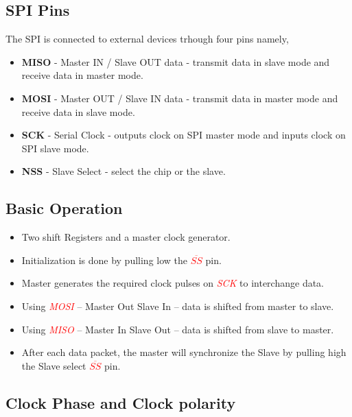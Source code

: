 \documentclass{article}
\newcommand{\pinFormat}[1]{\emph{\textcolor{red}{#1}}}
\begin{document}
\subsection{SPI Pins}
\quad The SPI is connected to external devices trhough four pins namely,
\begin{itemize}
	\item \textbf{MISO} - Master IN / Slave OUT data - transmit data in slave mode and receive data in master mode.
	\item \textbf{MOSI} - Master OUT / Slave IN data - transmit data in master mode and receive data in slave mode.
	\item \textbf{SCK} - Serial Clock - outputs clock on SPI master mode and inputs clock on SPI slave mode.
	\item \textbf{NSS} - Slave Select - select the chip or the slave.
\end{itemize}
\subsection{Basic Operation}
\begin{itemize}
    \item Two shift Registers and a master clock generator.
    \item Initialization is done by pulling low the \pinFormat{$\overline{SS}$} pin.
    \item Master generates the required clock pulses on \pinFormat{SCK} to interchange data.
    \item Using \pinFormat{MOSI} – Master Out Slave In – data is shifted from master to slave.
    \item Using \pinFormat{MISO} – Master In Slave Out – data is shifted from slave to master.
    \item After each data packet, the master will synchronize the Slave by pulling high the Slave select  \pinFormat{$\overline{SS}$} pin.
\end{itemize}




\subsection{Clock Phase and Clock polarity}
\end{document}
